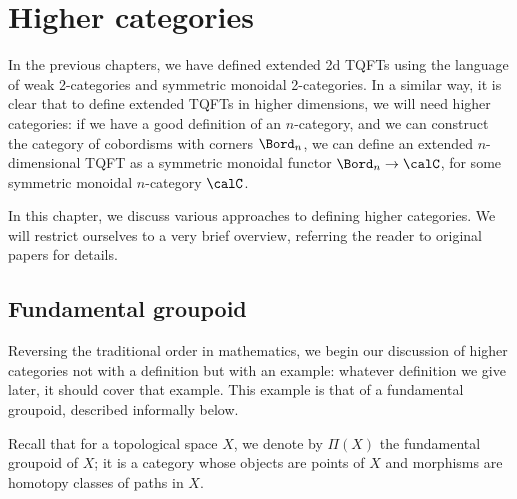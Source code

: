\chapter{Higher categories}\label{c:higher-cat}

In the previous chapters, we have defined extended 2d TQFTs using
the language of weak 2-categories and symmetric monoidal 2-categories. In a
similar way, it is clear that to define extended TQFTs in higher
dimensions, we will need higher categories: if we have a good definition of
an $n$-category, and we can construct the category of cobordisms with
corners $\Bord_n$, we can define an extended $n$-dimensional TQFT as a
symmetric monoidal functor $\Bord_n\to \calC$, for some symmetric monoidal
$n$-category $\calC$.

In this chapter, we discuss various approaches to defining higher categories. We
will restrict ourselves to a very brief overview, referring the reader to
original papers for details.




\section{Fundamental groupoid}\label{s:fundamental-groupoid}

Reversing the traditional order in mathematics, we begin our discussion of
higher categories not with a definition but with an example: whatever definition
we give later, it should cover that example. This example is that of a
fundamental groupoid, described informally below.


Recall that for a topological space $X$, we denote by $\Pi(X)$ the fundamental
groupoid of $X$; it is a category whose objects are points of $X$ and morphisms
are homotopy classes of paths in $X$.


